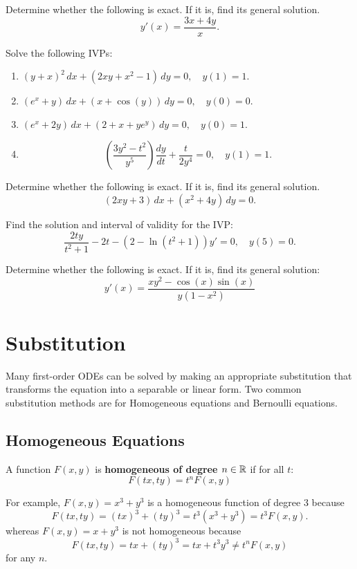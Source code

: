 \begin{question}
  Determine whether the following \ode{} is exact. If it is, find its general solution.
\[
  y'(x) = \frac{3x+4y}{x}.
\]
\end{question}


\begin{question}
  Solve the following IVPs:
  \begin{enumerate}
    \item \((y + x)^2\,dx + (2xy + x^2 -1)\,dy = 0, \quad y(1) = 1\).
    \item \((e^x + y)\,dx + (x + \cos(y))\,dy = 0, \quad y(0) = 0\).
    \item \((e^x + 2y)\,dx + (2 + x + ye^y)\,dy = 0, \quad y(0) = 1\).
    \item \[ 
          \left(\frac{3y^2 - t^2}{y^5}\right)\frac{dy}{dt} + \frac{t}{2y^4} = 0, \quad y(1) = 1.
          \]
  \end{enumerate}
\end{question}

\begin{question}
  Determine whether the following \ode{} is exact. If it is, find its general solution.
  \[
    (2xy + 3)\,dx + (x^{2} + 4y)\,dy = 0.
  \]
\end{question}

\begin{question}
  Find the solution and interval of validity for the IVP:
  \[
  \frac{2ty}{t^2 +1} - 2t - (2-\ln(t^2+1))y' = 0, \quad y(5)=0.
  \]
\end{question}

\begin{question}
  Determine whether the following \ode{} is exact. If it is, find its general solution:
  \[
    y'(x) = \frac{xy^{2} - \cos(x)\sin(x)}{y(1-x^{2})}
  \]
\end{question}







\section{Substitution}
Many first-order ODEs can be solved by making an appropriate substitution that transforms the equation into a separable or linear form.
Two common substitution methods are for Homogeneous equations and Bernoulli equations.

\subsection{Homogeneous Equations}
\begin{definition}
  A function \(F(x,y)\) is \textbf{homogeneous of degree \(n\in\mathbb{R}\)} if for all \(t\):
  $$ F(tx,ty) = t^n F(x,y) $$
\end{definition}
For example, \(F(x,y) = x^3 + y^3\) is a homogeneous function of degree \(3\) because
\[F(tx,ty) = (tx)^3 + (ty)^3 = t^3(x^3 + y^3) = t^3 F(x,y).\]
whereas \(F(x,y) = x + y^3\) is not homogeneous because
\[F(tx,ty) = tx + (ty)^3 = tx + t^3y^3 \neq t^n F(x,y)\] for any \(n\).


